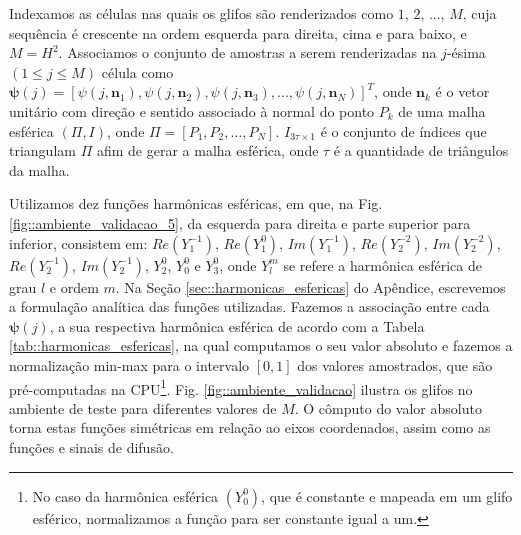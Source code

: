 \documentclass[
    12pt,                %
    oneside,            %
    a4paper,            %
    english,            %
    french,                %
    spanish,            %
    brazil                %
    ]{abntex2}
\begin{document}
Indexamos as células nas quais os glifos são renderizados como $1$, $2$, ..., $M$, cuja sequência é crescente na ordem esquerda para direita, cima e para baixo, e $M = H^2$. Associamos o conjunto de amostras a serem renderizadas na $j$-ésima $(1 \leq j \leq M)$ célula como $\boldsymbol{\psi}(j) = [
\psi(j, \mathbf{n}_1), 
\psi(j, \mathbf{n}_2), 
\psi(j, \mathbf{n}_3), ..., 
\psi(j, \mathbf{n}_N)
]^T$, onde $\mathbf{n}_k$ é o vetor unitário com direção e sentido associado à normal do ponto $P_k$ de uma malha esférica $(\Pi, I)$, onde $\Pi = [P_1, P_2, \dots, P_N]$. $I_{3\tau \times 1}$ é o conjunto de índices que triangulam $\Pi$ afim de gerar a malha esférica, onde $\tau$ é a quantidade de triângulos da malha.%

Utilizamos dez funções harmônicas esféricas, em que, na Fig. \ref{fig::ambiente_validacao_5}, da esquerda para direita e parte superior para inferior, consistem em: $Re(Y_1^{-1})$,
$Re(Y_1^0)$,
$Im(Y_1^{-1})$,
$Re(Y_2^{-2})$,
$Im(Y_2^{-2})$,
$Re(Y_2^{-1})$,
$Im(Y_2^{-1})$,
$Y_2^0$,
$Y_0^0$ e
$Y_3^0$, onde $Y_l^m$ se refere a harmônica esférica de grau $l$ e ordem $m$. Na Seção \ref{sec::harmonicas_esfericas} do Apêndice, escrevemos a formulação analítica das funções utilizadas. Fazemos a associação entre cada $\boldsymbol{\psi}(j)$, a sua respectiva harmônica esférica de acordo com a Tabela \ref{tab::harmonicas_esfericas}, na qual computamos o seu valor absoluto e fazemos a normalização min-max para o intervalo $[0, 1]$ dos valores amostrados, que são pré-computadas na CPU\footnote{No caso da harmônica esférica $(Y_0^0)$, que é constante e mapeada em um glifo esférico, normalizamos a função para ser constante igual a um.}. Fig. \ref{fig::ambiente_validacao} ilustra os glifos no ambiente de teste para diferentes valores de $M$. O cômputo do valor absoluto torna estas funções simétricas em relação ao eixos coordenados, assim como as funções e sinais de difusão.
\end{document}
